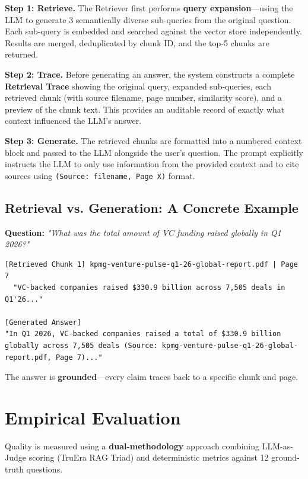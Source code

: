 \documentclass[11pt, a4paper]{article}
\begin{document}
\textbf{Step 1: Retrieve.} The Retriever first performs \textbf{query expansion}---using the LLM to generate 3 semantically diverse sub-queries from the original question. Each sub-query is embedded and searched against the vector store independently. Results are merged, deduplicated by chunk ID, and the top-5 chunks are returned.

\textbf{Step 2: Trace.} Before generating an answer, the system constructs a complete \textbf{Retrieval Trace} showing the original query, expanded sub-queries, each retrieved chunk (with source filename, page number, similarity score), and a preview of the chunk text. This provides an auditable record of exactly what context influenced the LLM's answer.

\textbf{Step 3: Generate.} The retrieved chunks are formatted into a numbered context block and passed to the LLM alongside the user's question. The prompt explicitly instructs the LLM to only use information from the provided context and to cite sources using \texttt{(Source: filename, Page X)} format.

\subsection{Retrieval vs. Generation: A Concrete Example}
\textbf{Question:} \textit{"What was the total amount of VC funding raised globally in Q1 2026?"}

\begin{lstlisting}[caption={Example of Retrieved Chunks and Grounded Generation}]
[Retrieved Chunk 1] kpmg-venture-pulse-q1-26-global-report.pdf | Page 7
  "VC-backed companies raised $330.9 billion across 7,505 deals in Q1'26..."

[Generated Answer]
"In Q1 2026, VC-backed companies raised a total of $330.9 billion globally across 7,505 deals (Source: kpmg-venture-pulse-q1-26-global-report.pdf, Page 7)..."
\end{lstlisting}
The answer is \textbf{grounded}---every claim traces back to a specific chunk and page.

\section{Empirical Evaluation}

Quality is measured using a \textbf{dual-methodology} approach combining LLM-as-Judge scoring (TruEra RAG Triad) and deterministic metrics against 12 ground-truth questions.
\end{document}
